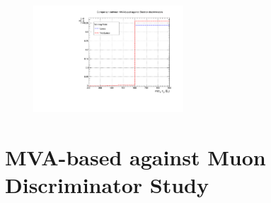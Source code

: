 \begin{figure}[ht]
\begin{center}
\captionsetup[subfloat]{farskip=0pt,captionskip=0.0cm,labelformat=empty}
\includegraphics[clip,width=0.5\textwidth]{figuras/AppendiceB/againstElectronWP/againstElectron.pdf}
\end{center}
\end{figure}


\section{MVA-based against Muon Discriminator Study}
\label{Results:TauID-isoDicr}

